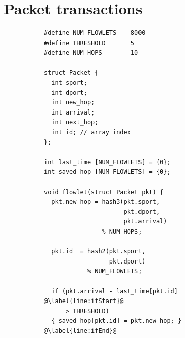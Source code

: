 \section{Packet transactions}
\label{s:transactions}

\begin{figure}[!t]
\begin{subfigure}{0.5\textwidth}
\begin{small}
\begin{lstlisting}[style=customc]
#define NUM_FLOWLETS    8000
#define THRESHOLD       5
#define NUM_HOPS        10

struct Packet {
  int sport;
  int dport;
  int new_hop;
  int arrival;
  int next_hop;
  int id; // array index
};

int last_time [NUM_FLOWLETS] = {0};
int saved_hop [NUM_FLOWLETS] = {0};

void flowlet(struct Packet pkt) {
  pkt.new_hop = hash3(pkt.sport,
                      pkt.dport,
                      pkt.arrival)
                % NUM_HOPS;

  pkt.id  = hash2(pkt.sport,
                  pkt.dport)
            % NUM_FLOWLETS;

  if (pkt.arrival - last_time[pkt.id] @\label{line:ifStart}@
      > THRESHOLD)
  { saved_hop[pkt.id] = pkt.new_hop; } @\label{line:ifEnd}@


\end{lstlisting}
\end{small}
\end{subfigure}
\end{figure}
